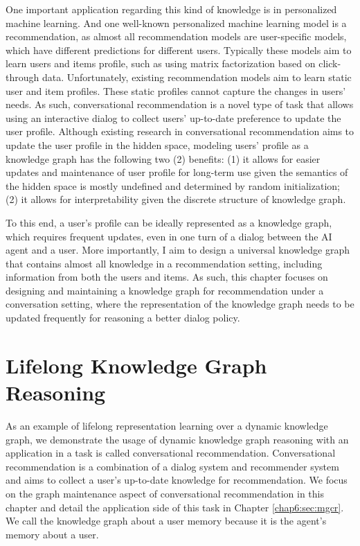 One important application regarding this kind of knowledge is in personalized machine learning.
And one well-known personalized machine learning model is a recommendation, as almost all recommendation models are user-specific models, which have different predictions for different users.
Typically these models aim to learn users and items profile, such as using matrix factorization based on click-through data.
Unfortunately, existing recommendation models aim to learn static user and item profiles.
These static profiles cannot capture the changes in users' needs.
As such, conversational recommendation \cite{li2018towards,kang2019recommendation} is a novel type of task that allows using an interactive dialog to collect users' up-to-date preference to update the user profile.
Although existing research in conversational recommendation aims to update the user profile in the hidden space, modeling users' profile as a knowledge graph has the following two (2) benefits: (1) it allows for easier updates and maintenance of user profile for long-term use given the semantics of the hidden space is mostly undefined and determined by random initialization; (2) it allows for interpretability given the discrete structure of knowledge graph.

To this end, a user's profile can be ideally represented as a knowledge graph, which requires frequent updates, even in one turn of a dialog between the AI agent and a user.
More importantly, I aim to design a universal knowledge graph that contains almost all knowledge in a recommendation setting, including information from both the users and items.
As such, this chapter focuses on designing and maintaining a knowledge graph for recommendation under a conversation setting, where the representation of the knowledge graph needs to be updated frequently for reasoning a better dialog policy.

\section{Lifelong Knowledge Graph Reasoning}
\label{chap5:sec:reason}

As an example of lifelong representation learning over a dynamic knowledge graph, we demonstrate the usage of dynamic knowledge graph reasoning with an application in a task is called conversational recommendation. 
Conversational recommendation is a combination of a dialog system and recommender system and aims to collect a user's up-to-date knowledge for recommendation. 
We focus on the graph maintenance aspect of conversational recommendation in this chapter and detail the application side of this task in Chapter \ref{chap6:sec:mgcr}.
We call the knowledge graph about a user memory because it is the agent's memory about a user.
 
